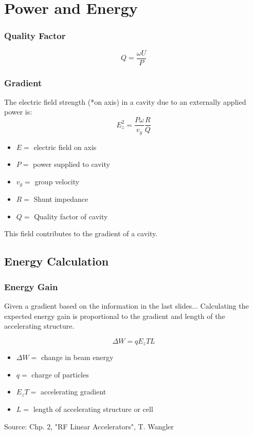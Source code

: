 \documentclass[professionalfonts,t]{beamer}
\begin{document}
\section{Power and Energy }
\begin{frame}
	\frametitle{Quality Factor}
	\begin{equation}
		Q= \frac{\omega U}{P}
	\end{equation}
\end{frame}

\begin{frame}
	\frametitle{Gradient}
	The electric field strength (*on axis) in a cavity 
	due to an externally applied power is:
	\begin{equation}
		E^2_z = \frac{P\omega}{v_g} \frac{R}{Q}
	\end{equation}
	\begin{itemize}
		\item $E =$ electric field on axis
		\item $P =$ power supplied to cavity
		\item $v_g =$ group velocity
		\item $R =$ Shunt impedance 
		\item $Q =$ Quality factor of cavity
	\end{itemize}

\vspace{0.5em}
This field contributes to the gradient of a cavity.
\end{frame}

\subsection{Energy Calculation}
\begin{frame}
\frametitle{Energy Gain}
Given a gradient based on the information in the last slides...
Calculating the expected energy gain is proportional to the gradient and length of the accelerating structure. 

\begin{equation}
	\Delta W = qE_zTL
\end{equation}

\begin{itemize}
	\item $\Delta W = $ change in beam energy
	\item $q =$ charge of particles
	\item $E_zT = $ accelerating gradient
	\item $L = $ length of accelerating structure or cell 
\end{itemize}

\vspace{1em}
Source: Chp. 2, "RF Linear Accelerators", T. Wangler
\end{frame}
\end{document}
